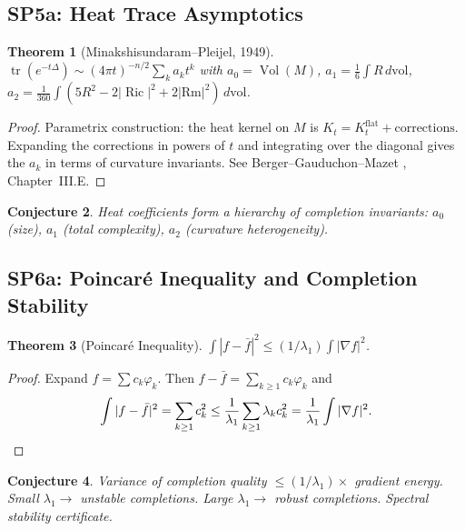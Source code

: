 \documentclass[11pt]{article}
\newtheorem{theorem}{Theorem}[section]
\newtheorem{conjecture}[theorem]{Conjecture}
\theoremstyle{definition}
\theoremstyle{remark}
\newcommand{\Ric}{\operatorname{Ric}}
\newcommand{\Vol}{\operatorname{Vol}}
\newcommand{\dvol}{\,d\mathrm{vol}}
\begin{document}
\subsection{SP5a: Heat Trace Asymptotics}

\begin{theorem}[Minakshisundaram--Pleijel, 1949]\label{thm:heattrace}
$\operatorname{tr}(e^{-t\Delta}) \sim (4\pi t)^{-n/2}\sum_k a_k t^k$ with $a_0 = \Vol(M)$, $a_1 = \frac{1}{6}\int R\dvol$, $a_2 = \frac{1}{360}\int(5R^2 - 2|\Ric|^2 + 2|\mathrm{Rm}|^2)\dvol$.
\end{theorem}

\begin{proof}
Parametrix construction: the heat kernel on $M$ is $K_t = K_t^{\mathrm{flat}} + \text{corrections}$. Expanding the corrections in powers of $t$ and integrating over the diagonal gives the $a_k$ in terms of curvature invariants. See Berger--Gauduchon--Mazet \cite{BGM}, Chapter~III.E.
\end{proof}

\begin{conjecture}\label{conj:heattrace}
Heat coefficients form a hierarchy of completion invariants: $a_0$ (size), $a_1$ (total complexity), $a_2$ (curvature heterogeneity).
\end{conjecture}

\subsection{SP6a: Poincar\'{e} Inequality and Completion Stability}

\begin{theorem}[Poincar\'{e} Inequality]\label{thm:poincare}
$\int|f - \bar{f}|^2 \le (1/\lambda_1)\int|\nabla f|^2$.
\end{theorem}

\begin{proof}
Expand $f = \sum c_k\varphi_k$. Then $f - \bar{f} = \sum_{k\ge 1}c_k\varphi_k$ and
\[
\int|f - \bar{f}|^2 = \sum_{k\ge 1}c_k^2 \le \frac{1}{\lambda_1}\sum_{k\ge 1}\lambda_k c_k^2 = \frac{1}{\lambda_1}\int|\nabla f|^2. \qedhere
\]
\end{proof}

\begin{conjecture}\label{conj:stability}
Variance of completion quality $\le (1/\lambda_1) \times$ gradient energy. Small $\lambda_1 \to$ unstable completions. Large $\lambda_1 \to$ robust completions. Spectral stability certificate.
\end{conjecture}
\end{document}
